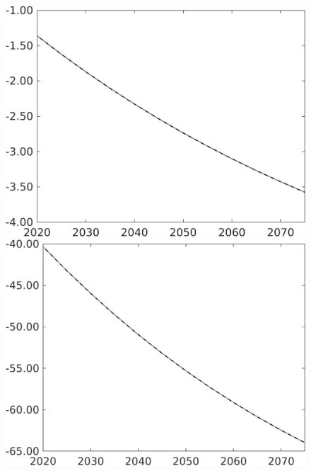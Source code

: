 \documentclass[12pt]{article}
\begin{document}
\begin{figure}[h!!]
\begin{minipage}[]{0.32\textwidth}
	\end{minipage}	
	\begin{minipage}[]{0.32\textwidth}
		\includegraphics[width=1\textwidth]{../../codding_model/own_basedOnFried/optimalPol_010922_revision/figures/all_13Sept22/PerdifNoTauf_regime0_CompTaul_C_spillover0_nsk0_xgr0_knspil1_sep1_LFlimit0_emsbase0_countec0_GovRev0_etaa0.79_lgd0.png}
	\end{minipage}	
	\begin{minipage}[]{0.32\textwidth}
		\includegraphics[width=1\textwidth]{../../codding_model/own_basedOnFried/optimalPol_010922_revision/figures/all_13Sept22/PerdifNoTauf_regime0_CompTaul_F_spillover0_nsk0_xgr0_knspil1_sep1_LFlimit0_emsbase0_countec0_GovRev0_etaa0.79_lgd0.png}

\end{minipage}
\end{figure}
\end{document}
